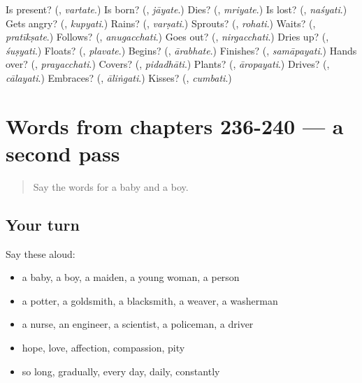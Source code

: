 \begin{tcolorbox}[breakable,colback=teal!4,colframe=teal!35!black,title={Before you move on}]
Is present? (\textbf{}, \emph{vartate}.) Is born? (\textbf{}, \emph{jāyate}.) Dies? (\textbf{}, \emph{mriyate}.) Is lost? (\textbf{}, \emph{naśyati}.) Gets angry? (\textbf{}, \emph{kupyati}.) Rains? (\textbf{}, \emph{varṣati}.) Sprouts? (\textbf{}, \emph{rohati}.) Waits? (\textbf{}, \emph{pratīkṣate}.) Follows? (\textbf{}, \emph{anugacchati}.) Goes out? (\textbf{}, \emph{nirgacchati}.) Dries up? (\textbf{}, \emph{śuṣyati}.) Floats? (\textbf{}, \emph{plavate}.) Begins? (\textbf{}, \emph{ārabhate}.) Finishes? (\textbf{}, \emph{samāpayati}.) Hands over? (\textbf{}, \emph{prayacchati}.) Covers? (\textbf{}, \emph{pidadhāti}.) Plants? (\textbf{}, \emph{āropayati}.) Drives? (\textbf{}, \emph{cālayati}.) Embraces? (\textbf{}, \emph{āliṅgati}.) Kisses? (\textbf{}, \emph{cumbati}.)
\end{tcolorbox}
\section[(dialogue)]{Words from chapters 236-240 — a second pass}

\label{lesson:SA-R240-second-pass-words-from-chapters-236-240}



\begin{quote}
Say the words for a baby and a boy.
\end{quote}

\subsection*{Your turn}
Say these aloud:

\begin{itemize}
\raggedright
  \item a baby, a boy, a maiden, a young woman, a person
  \item a potter, a goldsmith, a blacksmith, a weaver, a washerman
  \item a nurse, an engineer, a scientist, a policeman, a driver
  \item hope, love, affection, compassion, pity
  \item so long, gradually, every day, daily, constantly
\end{itemize}

